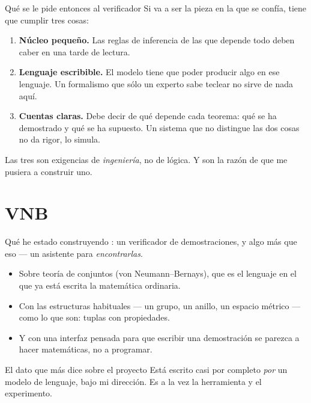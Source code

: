 \documentclass[11pt,aspectratio=169]{beamer}
\begin{document}
\begin{frame}{Qué se le pide entonces al verificador}
  Si va a ser la pieza en la que se confía, tiene que cumplir tres cosas:
  \vfill
  \begin{enumerate}
    \item \textbf{Núcleo pequeño.} Las reglas de inferencia de las que depende
          todo deben caber en una tarde de lectura.
    \item \textbf{Lenguaje escribible.} El modelo tiene que poder producir
          algo en ese lenguaje. Un formalismo que sólo un experto sabe teclear
          no sirve de nada aquí.
    \item \textbf{Cuentas claras.} Debe decir de qué depende cada teorema: qué
          se ha demostrado y qué se ha supuesto. Un sistema que no distingue
          las dos cosas no da rigor, lo simula.
  \end{enumerate}
  \vfill
  Las tres son exigencias de \emph{ingeniería}, no de lógica. Y son la razón
  de que me pusiera a construir uno.
\end{frame}

\section{VNB}

\begin{frame}{Qué he estado construyendo}
  \textbf{\vnb{}}: un verificador de demostraciones, y algo más que eso --- un
  asistente para \emph{encontrarlas}.
  \vfill
  \begin{itemize}
    \item Sobre teoría de conjuntos (von Neumann--Bernays), que es el lenguaje
          en el que ya está escrita la matemática ordinaria.
    \item Con las estructuras habituales --- un grupo, un anillo, un espacio
          métrico --- como lo que son: tuplas con propiedades.
    \item Y con una interfaz pensada para que escribir una demostración se
          parezca a hacer matemáticas, no a programar.
  \end{itemize}
  \vfill
  \begin{block}{El dato que más dice sobre el proyecto}
    Está escrito casi por completo \emph{por} un modelo de lenguaje, bajo mi
    dirección. Es a la vez la herramienta y el experimento.
  \end{block}
\end{frame}
\end{document}

